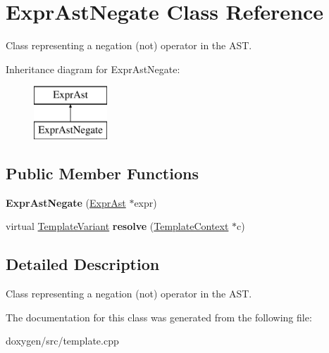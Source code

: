 \hypertarget{class_expr_ast_negate}{}\section{Expr\+Ast\+Negate Class Reference}
\label{class_expr_ast_negate}


Class representing a negation (not) operator in the A\+ST.  


Inheritance diagram for Expr\+Ast\+Negate\+:\begin{figure}[H]
\begin{center}
\leavevmode
\includegraphics[height=2.000000cm]{class_expr_ast_negate}
\end{center}
\end{figure}
\subsection*{Public Member Functions}
\begin{DoxyCompactItemize}
\item 
\mbox{\label{class_expr_ast_negate_a54be01af052e421181b80147c8b93807}} 
{\bfseries Expr\+Ast\+Negate} (\mbox{\hyperlink{class_expr_ast}{Expr\+Ast}} $\ast$expr)
\item 
\mbox{\label{class_expr_ast_negate_a1cf3fec89cf143e2bf25aa8b38e3fb6e}} 
virtual \mbox{\hyperlink{class_template_variant}{Template\+Variant}} {\bfseries resolve} (\mbox{\hyperlink{class_template_context}{Template\+Context}} $\ast$c)
\end{DoxyCompactItemize}


\subsection{Detailed Description}
Class representing a negation (not) operator in the A\+ST. 

The documentation for this class was generated from the following file\+:\begin{DoxyCompactItemize}
\item 
doxygen/src/template.\+cpp\end{DoxyCompactItemize}
